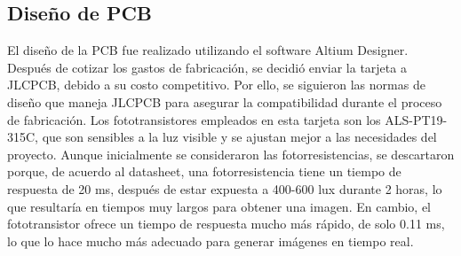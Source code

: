 \subsection{Diseño de PCB}
El diseño de la PCB fue realizado utilizando el software Altium Designer. Después de cotizar los gastos de fabricación, se decidió enviar la tarjeta a JLCPCB, debido a su costo competitivo. Por ello, se siguieron las normas de diseño que maneja JLCPCB para asegurar la compatibilidad durante el proceso de fabricación. Los fototransistores empleados en esta tarjeta son los ALS-PT19-315C, que son sensibles a la luz visible y se ajustan mejor a las necesidades del proyecto. Aunque inicialmente se consideraron las fotorresistencias, se descartaron porque, de acuerdo al datasheet, una fotorresistencia tiene un tiempo de respuesta de 20 ms, después de estar expuesta a 400-600 lux durante 2 horas, lo que resultaría en tiempos muy largos para obtener una imagen. En cambio, el fototransistor ofrece un tiempo de respuesta mucho más rápido, de solo 0.11 ms, lo que lo hace mucho más adecuado para generar imágenes en tiempo real.



